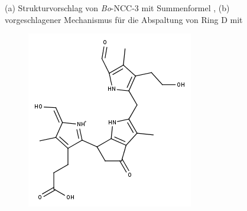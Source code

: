 \begin{figure}[!htbp]
\begin{subfigure}[b]{0.5\textwidth}
    \caption{}
    \label{fig:480Mechanismus}
  \end{subfigure}
  \caption[Strukturvorschlag von \textit{Bo}-NCC-3 und Vorschlag für Mechanismus der Abspaltung von Ring D, Quelle: Autor]{(a) Strukturvorschlag von \textit{Bo}-NCC-3 mit Summenformel , (b) vorgeschlagener Mechanismus für die Abspaltung von Ring D mit }
\end{figure}

\begin{figure}[!htbp]
  \begin{subfigure}[b]{0.5\textwidth}
    \includegraphics[width=\textwidth]{figures/Kapitel7/Kataboliten/fragmentation_structures/VWA_Katabolit_647-CO2-RingD_480_MH_Enolform.png}
    \caption{}
    \label{fig:NCC2725}
  \end{subfigure}
  \hfill
  \begin{subfigure}[b]{0.5\textwidth}

\end{subfigure}
\end{figure}
